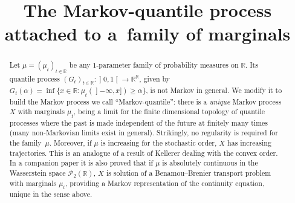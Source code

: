 \documentclass[JEP,XML,SOM,Unicode,NoEqCountersInSection,NoFloatCountersInSection,published]{cedram}
\theoremstyle{plain}
\theoremstyle{definition}
\begin{document}
\frontmatter

\title[The Markov-quantile process]{The Markov-quantile process attached to a~family of marginals}

\author[\initial{C.} \lastname{Boubel}]{ }
\address{Institut de Recherche Mathématique Avancée, UMR 7501, Université de Strasbourg et CNRS\\
7 rue René Descartes, 67000 Strasbourg, France}

\author[\initial{N.} \lastname{Juillet}]{ }
\address{Institut de Recherche Mathématique Avancée, UMR 7501, Université de Strasbourg et CNRS\\
7 rue René Descartes, 67000 Strasbourg, France}



\begin{abstract}
Let $\mu=(\mu_t)_{t\in \mathbb{R}}$ be any $1$-parameter family of probability measures on $\mathbb{R}$. Its quantile process $(G_t)_{t\in\mathbb{R}}:\mathopen]0,1\mathclose[\to\mathbb{R}^\mathbb{R}$, given by $G_t(\alpha)=\inf\{x\in\mathbb{R}:\mu_t(\mathopen]-\infty,x\mathclose])\geqslant\alpha\}$, is not Markov in general.
We modify it to build the Markov process we call ``Markov-quantile'':
there is a \emph{unique} Markov process $X$ with marginals $\mu_t$, being a limit for the finite dimensional topology of quantile processes where the past is made independent of the future at finitely many times (many non-Markovian limits exist in general). Strikingly, no regularity is required for the family~$\mu$.
Moreover, if $\mu$ is increasing for the stochastic order, $X$ has increasing trajectories. This is an analogue of a result of Kellerer dealing with the convex order.
In a companion paper \cite{BouJui2} it is also proved that if $\mu$ is absolutely continuous in the Wasserstein space $\mathcal{P}_2(\mathbb{R})$, $X$ is solution of a Benamou--Brenier transport problem with marginals $\mu_t$, providing a Markov representation of the continuity equation, unique in the sense above.
\end{abstract}
\end{document}
